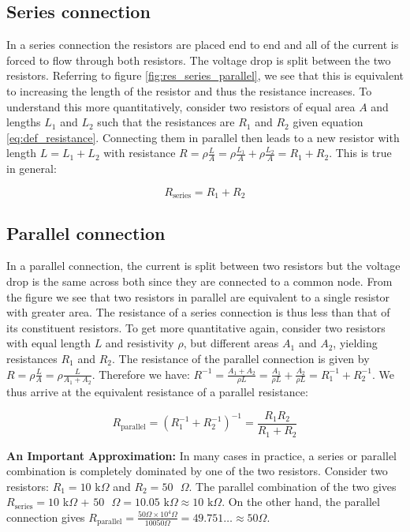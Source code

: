 \documentclass{tufte-book}
\begin{document}
\subsection{Series connection} In a series connection the resistors are placed end to end and all of the current is forced to flow through both resistors. The voltage drop is split between the two resistors. Referring to figure \ref{fig:res_series_parallel}, we see that this is equivalent to increasing the length of the resistor and thus the resistance increases. To understand this more quantitatively, consider two resistors of equal area $A$ and lengths $L_1$ and $L_2$ such that the resistances are $R_1$ and $R_2$ given equation \ref{eq:def_resistance}. Connecting them in parallel then leads to a new resistor with length $L = L_1 + L_2$ with resistance $R = \rho\frac{L}{A} = \rho\frac{L_1}{A} + \rho\frac{L_2}{A} = R_1 + R_2$.  This is true in general:

\begin{equation}\label{eq:series_res}
\boxed{R_{\text{series}} = R_1+R_2}
\end{equation}

\subsection{Parallel connection} In a parallel connection, the current is split between two resistors but the voltage drop is the same across both since they are connected to a common node. From the figure we see that two resistors in parallel are equivalent to a single resistor with greater area. The resistance of a series connection is thus less than that of its constituent resistors. To get more quantitative again, consider two resistors with equal length $L$ and resistivity $\rho$, but different areas $A_1$ and $A_2$, yielding resistances $R_1$ and $R_2$. The resistance of the parallel connection is given by $R = \rho\frac{L}{A} = \rho\frac{L}{A_1+A_2}$. Therefore we have: $R^{-1} = \frac{A_1+A_2}{\rho L} = \frac{A_1}{\rho L} + \frac{A_2}{\rho L} = R_1^{-1} + R_2^{-1}$. We thus arrive at the equivalent resistance of a parallel resistance:

\begin{equation}\label{eq:series_par}
\boxed{R_{\text{parallel}} = \left(R_1^{-1}+R_2^{-1}\right)^{-1} = \frac{R_1R_2}{R_1+R_2}}
\end{equation}

\textbf{An Important Approximation:} In many cases in practice, a series or parallel combination is completely dominated by one of the two resistors. Consider two resistors: $R_1 = 10\text{ k}\Omega$ and  $R_2 = 50\text{ }\Omega$. The parallel combination of the two gives $R_{\text{series}} = 10$ k$\Omega$ + $50\text{ }\Omega = 10.05\text{ k}\Omega \approx 10\text{ k}\Omega$. On the other hand, the parallel connection gives $ R_{\text{parallel}} = \frac{50\Omega\times10^4\Omega}{10050\Omega} = 49.751\ldots \approx 50\Omega$. 
\end{document}
